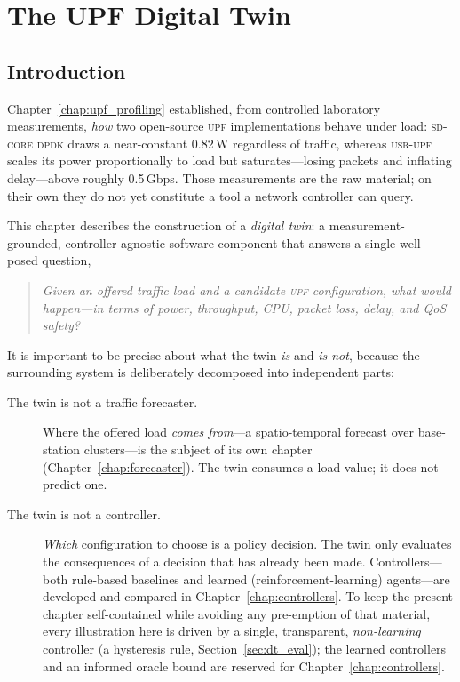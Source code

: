 \documentclass[12pt, a4paper]{report}
\newcommand{\dpdk}{\textsc{sd-core dpdk}}
\newcommand{\usr}{\textsc{usr-upf}}
\newcommand{\upf}{\textsc{upf}}
\begin{document}

\chapter{The UPF Digital Twin}
\label{chap:digital_twin}

\section{Introduction}
\label{sec:dt_intro}

Chapter~\ref{chap:upf_profiling} established, from controlled laboratory
measurements, \emph{how} two open-source \upf{} implementations behave under
load: \dpdk{} draws a near-constant 0.82\,W regardless of traffic, whereas
\usr{} scales its power proportionally to load but saturates---losing packets
and inflating delay---above roughly 0.5\,Gbps. Those measurements are the raw
material; on their own they do not yet constitute a tool a network controller
can query.

This chapter describes the construction of a \emph{digital twin}: a
measurement-grounded, controller-agnostic software component that answers a
single well-posed question,

\begin{quote}
  \emph{Given an offered traffic load and a candidate \upf{} configuration,
  what would happen---in terms of power, throughput, CPU, packet loss, delay,
  and QoS safety?}
\end{quote}

\noindent
It is important to be precise about what the twin \emph{is} and \emph{is not},
because the surrounding system is deliberately decomposed into independent
parts:

\begin{description}
  \item[The twin is not a traffic forecaster.] Where the offered load
    \emph{comes from}---a spatio-temporal forecast over base-station
    clusters---is the subject of its own chapter
    (Chapter~\ref{chap:forecaster}). The twin consumes a load value; it does
    not predict one.
  \item[The twin is not a controller.] \emph{Which} configuration to choose
    is a policy decision. The twin only evaluates the consequences of a
    decision that has already been made. Controllers---both rule-based
    baselines and learned (reinforcement-learning) agents---are developed and
    compared in Chapter~\ref{chap:controllers}. To keep the present chapter
    self-contained while avoiding any pre-emption of that material, every
    illustration here is driven by a single, transparent, \emph{non-learning}
    controller (a hysteresis rule, Section~\ref{sec:dt_eval}); the learned
    controllers and an informed oracle bound are reserved for
    Chapter~\ref{chap:controllers}.
\end{description}
\end{document}
